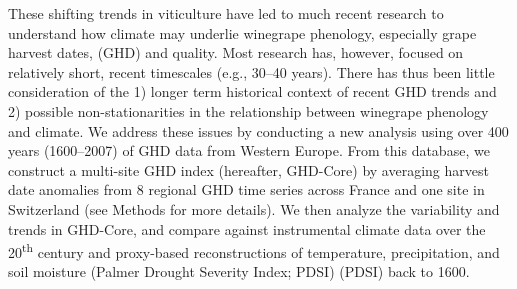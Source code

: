 \documentclass[final]{nature}
\begin{document}
These shifting trends in viticulture have led to much recent research to understand how climate may underlie winegrape phenology\cite{odo2012,webb2012}, especially grape harvest dates, (GHD) and quality\cite{coombe1987,jones2005 vanlee2009}.  Most research has, however, focused on relatively short, recent timescales (e.g., 30--40 years\cite{Duchene:2005bd,tomasi2011,webb2012}). There has thus been little consideration of the 1) longer term historical context of recent GHD trends and 2) possible non-stationarities in the relationship between winegrape phenology and climate. We address these issues by conducting a new analysis using over 400 years (1600--2007) of GHD data from Western Europe\cite{Daux2012}. From this database, we construct a multi-site GHD index (hereafter, GHD-Core) by averaging harvest date anomalies from 8 regional GHD time series across France and one site in Switzerland (see Methods for more details). We then analyze the variability and trends in GHD-Core, and compare against instrumental climate data over the 20\textsuperscript{th} century\cite{Harris2014} and proxy-based reconstructions of temperature\cite{Luterbacher2004}, precipitation\cite{Pauling2006}, and soil moisture (Palmer Drought Severity Index; PDSI)\cite{CookOWDA2015} (PDSI) back to 1600.\\
\end{document}

